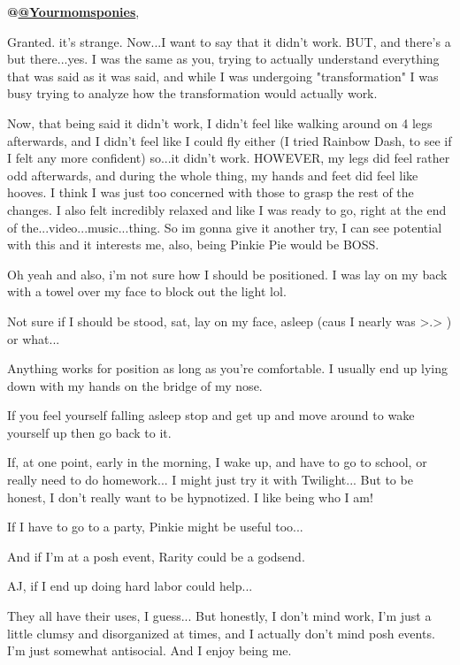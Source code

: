 \documentclass[ebook,12pt,oneside,openany]{memoir}
\begin{document}
\begin{tcolorbox}[title=Yourmomsponies]
\begin{tcolorbox}[title=Creeping Dusk]
\par{\textbf{@\href{https://mlpforums.com/profile/10550-yourmomsponies/}{@Yourmomsponies}}, }
\newline{}
\par{Granted. it's strange. Now...I want to say that it didn't work. BUT, and there's a but there...yes. I was the same as you, trying to actually understand everything that was said as it was said, and while I was undergoing "transformation" I was busy trying to analyze how the transformation would actually work. }
\newline{}
\par{Now, that being said it didn't work, I didn't feel like walking around on 4 legs afterwards, and I didn't feel like I could fly either (I tried Rainbow Dash, to see if I felt any more confident) so...it didn't work. HOWEVER, my legs did feel rather odd afterwards, and during the whole thing, my hands and feet did feel like hooves. I think I was just too concerned with those to grasp the rest of the changes. I also felt incredibly relaxed and like I was ready to go, right at the end of the...video...music...thing. So im gonna give it another try, I can see potential with this and it interests me, also, being Pinkie Pie would be BOSS.}
\par{Oh yeah and also, i'm not sure how I should be positioned. I was lay on my back with a towel over my face to block out the light lol. }
\par{Not sure if I should be stood, sat, lay on my face, asleep (caus I nearly was >.> ) or what...}
\end{tcolorbox}
\par{Anything works for position as long as you're comfortable. I usually end up lying down with my hands on the bridge of my nose. }
\par{If you feel yourself falling asleep stop and get up and move around to wake yourself up then go back to it.}
\end{tcolorbox}
\begin{tcolorbox}[title=Skye Starlight]
\par{If, at one point, early in the morning, I wake up, and have to go to school, or really need to do homework... I might just try it with Twilight... But to be honest, I don't really want to be hypnotized. I like being who I am!}
\newline{}
\par{If I have to go to a party, Pinkie might be useful too...}
\newline{}
\par{And if I'm at a posh event, Rarity could be a godsend.}
\newline{}
\par{AJ, if I end up doing hard labor could help...}
\newline{}
\par{They all have their uses, I guess... But honestly, I don't mind work, I'm just a little clumsy and disorganized at times, and I actually don't mind posh events. I'm just somewhat antisocial. And I enjoy being me.}
\end{tcolorbox}
\end{document}

